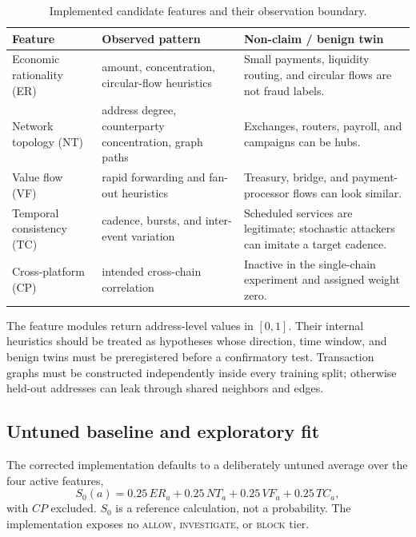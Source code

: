 \begin{table}[h]
\centering
\caption{Implemented candidate features and their observation boundary.}
\label{tab:candidate_features}
\small
\begin{tabularx}{\textwidth}{@{}l X X@{}}
\toprule
\textbf{Feature} & \textbf{Observed pattern} & \textbf{Non-claim / benign twin} \\
\midrule
Economic rationality (ER) & amount, concentration, circular-flow heuristics
  & Small payments, liquidity routing, and circular flows are not fraud labels. \\
Network topology (NT) & address degree, counterparty concentration, graph paths
  & Exchanges, routers, payroll, and campaigns can be hubs. \\
Value flow (VF) & rapid forwarding and fan-out heuristics
  & Treasury, bridge, and payment-processor flows can look similar. \\
Temporal consistency (TC) & cadence, bursts, and inter-event variation
  & Scheduled services are legitimate; stochastic attackers can imitate a target cadence. \\
Cross-platform (CP) & intended cross-chain correlation
  & Inactive in the single-chain experiment and assigned weight zero. \\
\bottomrule
\end{tabularx}
\end{table}

The feature modules return address-level values in $[0,1]$.  Their internal
heuristics should be treated as hypotheses whose direction, time window, and
benign twins must be preregistered before a confirmatory test.  Transaction
graphs must be constructed independently inside every training split; otherwise
held-out addresses can leak through shared neighbors and edges.

\subsection{Untuned baseline and exploratory fit}\label{subsec:fusion}

The corrected implementation defaults to a deliberately untuned average over
the four active features,
\begin{equation}\label{eq:baseline_score}
  S_0(a)=0.25\,ER_a+0.25\,NT_a+0.25\,VF_a+0.25\,TC_a,
\end{equation}
with $CP$ excluded.  $S_0$ is a reference calculation, not a probability.
The implementation exposes no \textsc{allow}, \textsc{investigate}, or
\textsc{block} tier.

